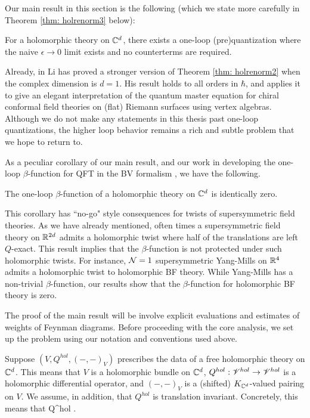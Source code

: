 \documentclass[11pt]{amsart}
\begin{document}
Our main result in this section is the following (which we state more carefully in Theorem \ref{thm: holrenorm3} below):

\begin{thm} \label{thm: holrenorm2}
For a holomorphic theory on $\mathbb C^d$, there exists a one-loop (pre)quantization where the naive $\epsilon \to 0$ limit exists and no counterterms are required.
\end{thm}

\begin{rmk}
Already, in \cite{LiVertex} Li has proved a stronger version of Theorem \ref{thm: holrenorm2} when the complex dimension is $d =1$.
His result holds to all orders in $\hbar$, and applies it to give an elegant interpretation of the quantum master equation for chiral conformal field theories on (flat) Riemann surfaces using vertex algebras.
Although we do not make any statements in this thesis past one-loop
quantizations, the higher loop behavior remains a rich and subtle problem that we hope to return to.
\end{rmk}

As a peculiar corollary of our main result, and our work in developing the one-loop $\beta$-function for QFT in the BV formalism \cite{EWY}, we have the following. 

\begin{cor}
The one-loop $\beta$-function of a holomorphic theory on $\mathbb C^d$ is identically zero. 
\end{cor}

This corollary has ``no-go" style consequences for twists of supersymmetric field theories. 
As we have already mentioned, often times a supersymmetric field theory on $\mathbb R^{2d}$ admits a holomorphic twist where half of the translations are left $Q$-exact.
This result implies that the $\beta$-function is not protected under such holomorphic twists. 
For instance, $\mathcal N=1$ supersymmetric Yang-Mills on $\mathbb R^4$ admits a holomorphic twist to holomorphic BF theory. 
While Yang-Mills has a non-trivial $\beta$-function, our results show that the $\beta$-function for holomorphic BF theory is zero. 

The proof of the main result will be involve explicit evaluations and estimates of weights of Feynman diagrams. 
Before proceeding with the core analysis, we set up the problem using our notation and conventions used above. 

Suppose $(V, Q^{hol}, (-,-)_V)$ prescribes the data of a free holomorphic theory on $\mathbb C^d$.
This means that $V$ is a holomorphic bundle on $\mathbb C^d$, $Q^{hol} : \mathscr V^{hol} \to \mathscr V^{hol}$ is a holomorphic differential operator, and $(-,-)_V$ is a (shifted) $K_{\mathbb C^d}$-valued pairing on $V$. 
We assume, in addition, that $Q^{hol}$ is translation invariant.
Concretely, this means that
\ben
Q^{hol} \in \CC {}.
\een
\end{document}
